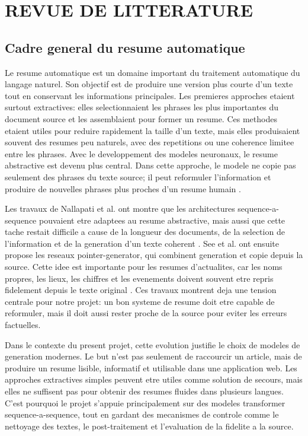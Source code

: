 \chapter{REVUE DE LITTERATURE}
\thispagestyle{empty}

\section{Cadre general du resume automatique}

Le resume automatique est un domaine important du traitement automatique du langage naturel. Son objectif est de produire une version plus courte d'un texte tout en conservant les informations principales. Les premieres approches etaient surtout extractives: elles selectionnaient les phrases les plus importantes du document source et les assemblaient pour former un resume. Ces methodes etaient utiles pour reduire rapidement la taille d'un texte, mais elles produisaient souvent des resumes peu naturels, avec des repetitions ou une coherence limitee entre les phrases. Avec le developpement des modeles neuronaux, le resume abstractive est devenu plus central. Dans cette approche, le modele ne copie pas seulement des phrases du texte source; il peut reformuler l'information et produire de nouvelles phrases plus proches d'un resume humain \cite{Nallapati2016Abstractive,See2017PointerGenerator}.

Les travaux de Nallapati et al. ont montre que les architectures sequence-a-sequence pouvaient etre adaptees au resume abstractive, mais aussi que cette tache restait difficile a cause de la longueur des documents, de la selection de l'information et de la generation d'un texte coherent \cite{Nallapati2016Abstractive}. See et al. ont ensuite propose les reseaux pointer-generator, qui combinent generation et copie depuis la source. Cette idee est importante pour les resumes d'actualites, car les noms propres, les lieux, les chiffres et les evenements doivent souvent etre repris fidelement depuis le texte original \cite{See2017PointerGenerator}. Ces travaux montrent deja une tension centrale pour notre projet: un bon systeme de resume doit etre capable de reformuler, mais il doit aussi rester proche de la source pour eviter les erreurs factuelles.

Dans le contexte du present projet, cette evolution justifie le choix de modeles de generation modernes. Le but n'est pas seulement de raccourcir un article, mais de produire un resume lisible, informatif et utilisable dans une application web. Les approches extractives simples peuvent etre utiles comme solution de secours, mais elles ne suffisent pas pour obtenir des resumes fluides dans plusieurs langues. C'est pourquoi le projet s'appuie principalement sur des modeles transformer sequence-a-sequence, tout en gardant des mecanismes de controle comme le nettoyage des textes, le post-traitement et l'evaluation de la fidelite a la source.

